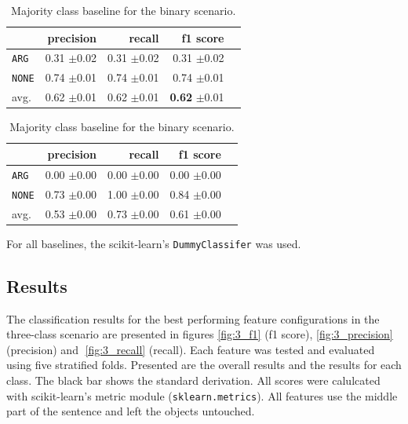 \begin{table}[!htb]
	\begin{minipage}{.5\linewidth}
		\caption{Random (stratified) baseline for the binary scenario.}
		\label{tbl:binmaj}
		\centering
		      
		\begin{tabularx}{0.97\linewidth}{Xrrrr}
			\toprule
			              & precision                    & recall                       & f1 score                              \\ \midrule 
			\texttt{ARG}  & 0.31 \scriptsize{$\pm$0.02} & 0.31 \scriptsize{$\pm$0.02} & 0.31 \scriptsize{$\pm$0.02}          \\ 
			\texttt{NONE} & 0.74 \scriptsize{$\pm$0.01} & 0.74 \scriptsize{$\pm$0.01} & 0.74 \scriptsize{$\pm$0.01}          \\ 
			avg.       & 0.62 \scriptsize{$\pm$0.01} & 0.62 \scriptsize{$\pm$0.01} & \textbf{0.62} \scriptsize{$\pm$0.01} \\ 
			\bottomrule
		\end{tabularx}
		
	\end{minipage}%
	\begin{minipage}{.5\linewidth}
		\centering
		\caption{Majority class baseline for the binary scenario.}
		\label{tbl:binstrat}
		\begin{tabularx}{0.97\linewidth}{Xrrrr}
			\toprule
			              & precision                    & recall                       & f1 score                     \\ \midrule 
			\texttt{ARG}  & 0.00 \scriptsize{$\pm$0.00} & 0.00 \scriptsize{$\pm$0.00} & 0.00 \scriptsize{$\pm$0.00} \\ 
			\texttt{NONE} & 0.73 \scriptsize{$\pm$0.00} & 1.00 \scriptsize{$\pm$0.00} & 0.84 \scriptsize{$\pm$0.00} \\ 
			avg.       & 0.53 \scriptsize{$\pm$0.00} & 0.73 \scriptsize{$\pm$0.00} & 0.61 \scriptsize{$\pm$0.00} \\ 
			\bottomrule
		\end{tabularx}
	\end{minipage} 
\end{table}
For all baselines, the scikit-learn's \texttt{DummyClassifer} was used.

\subsection{Results}
\label{sec:3_results}
The classification results for the best performing feature configurations in the three-class scenario are presented in figures \ref{fig:3_f1} (f1 score), \ref{fig:3_precision} (precision) and \ref{fig:3_recall} (recall). Each feature was tested and evaluated using five stratified folds. Presented are the overall results and the results for each class. The black bar shows the standard derivation. All scores were calulcated with scikit-learn's metric module (\texttt{sklearn.metrics}). All features use the middle part of the sentence and left the objects untouched.


